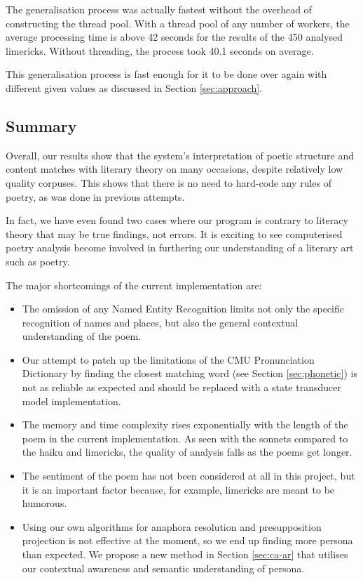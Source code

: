 The generalisation process was actually fastest without the overhead of constructing the thread pool. With a thread pool of any number of workers, the average processing time is above 42 seconds for the results of the 450 analysed limericks. Without threading, the process took 40.1 seconds on average.

This generalisation process is fast enough for it to be done over again with different given values as discussed in Section \ref{sec:approach}.

\subsection{Summary}
Overall, our results show that the system's interpretation of poetic structure and content matches with literary theory on many occasions, despite relatively low quality corpuses. This shows that there is no need to hard-code any rules of poetry, as was done in previous attempts.

In fact, we have even found two cases where our program is contrary to literacy theory that may be true findings, not errors. It is exciting to see computerised poetry analysis become involved in furthering our understanding of a literary art such as poetry.

The major shortcomings of the current implementation are:
\begin{itemize}
\item{The omission of any Named Entity Recognition limits not only the specific recognition of names and places, but also the general contextual understanding of the poem.}
\item{Our attempt to patch up the limitations of the CMU Pronunciation Dictionary by finding the closest matching word (see Section \ref{sec:phonetic}) is not as reliable as expected and should be replaced with a state transducer model implementation.}
\item{The memory and time complexity rises exponentially with the length of the poem in the current implementation. As seen with the sonnets compared to the haiku and limericks, the quality of analysis falls as the poems get longer.}
\item{The sentiment of the poem has not been considered at all in this project, but it is an important factor because, for example, limericks are meant to be humorous.}
\item{Using our own algorithms for anaphora resolution and presupposition projection is not effective at the moment, so we end up finding more persona than expected. We propose a new method in Section \ref{sec:ca-ar} that utilises our contextual awareness and semantic understanding of persona.}
\end{itemize}


